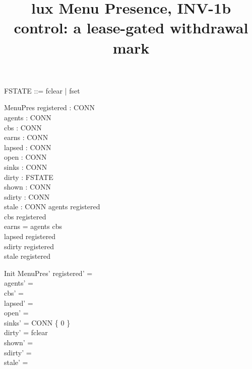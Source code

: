 \documentclass[a4paper,10pt,fleqn]{article}
\begin{document}
\title{lux Menu Presence, INV-1b control: a lease-gated withdrawal mark}
\maketitle

\begin{zed}
  [CONN]
\end{zed}

\begin{zed}
  FSTATE ::= fclear | fset
\end{zed}

\begin{schema}{MenuPres}
  registered : \power CONN \\
  agents : \power CONN \\
  cbs : \power CONN \\
  earns : \power CONN \\
  lapsed : \power CONN \\
  open : \power CONN \\
  sinks : CONN   \\
  dirty : FSTATE \\
  shown : \power CONN \\
  sdirty : \power CONN \\
  stale : \power CONN
\where
  agents \subseteq registered \\
  cbs \subseteq registered \\
  earns = agents \cup cbs \\
  lapsed \subseteq registered \\
  sdirty \subseteq registered \\
  stale \subseteq registered
\end{schema}

\begin{schema}{Init}
  MenuPres'
\where
  registered' = \emptyset \\
  agents' = \emptyset \\
  cbs' = \emptyset \\
  lapsed' = \emptyset \\
  open' = \emptyset \\
  sinks' = CONN \cross \{ 0 \} \\
  dirty' = fclear \\
  shown' = \emptyset \\
  sdirty' = \emptyset \\
  stale' = \emptyset
\end{schema}
\end{document}
